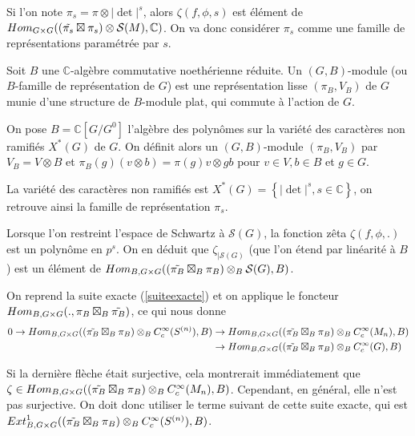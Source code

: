 Si l'on note $\pi_s = \pi \otimes |\det|^s$, alors $\zeta(f, \phi, s)$ est élément de $\operatorname{\mathnormal{Hom}}_{G \times G}((\tilde{\pi_s} \boxtimes \pi_s) \otimes \mathcal{S}(M), \mathbb{C})$. On va donc considérer $\pi_s$ comme une famille de représentations paramétrée par $s$.

\begin{definition}
Soit $B$ une $\mathbb{C}$-algèbre commutative noethérienne réduite. Un $(G, B)$-module (ou $B$-famille de représentation de $G$) est une représentation lisse $(\pi_B, V_B)$ de $G$ munie d'une structure de $B$-module plat, qui commute à l'action de $G$.
\end{definition}

On pose $B=\mathbb{C}[G/G^0]$ l'algèbre des polynômes sur la variété des caractères non ramifiés $X^*(G)$ de $G$. On définit alors un $(G,B)$-module $(\pi_B, V_B)$ par $V_B = V \otimes B$ et $\pi_B(g)(v \otimes b) = \pi(g)v \otimes gb$ pour $v \in V, b \in B$ et $g \in G$.

La variété des caractères non ramifiés est $X^*(G) = \left\lbrace |\det|^s, s \in \mathbb{C} \right\rbrace$, on retrouve ainsi la famille de représentation $\pi_s$.

Lorsque l'on restreint l'espace de Schwartz à $\mathcal{S}(G)$, la fonction zêta $\zeta(f, \phi, .)$ est un polynôme en $p^s$. On en déduit que $\zeta_{|\mathcal{S}(G)}$ (que l'on étend par linéarité à $B$) est un élément de $\operatorname{\mathnormal{Hom}}_{B, G \times G}((\tilde{\pi_B} \boxtimes_B \pi_B) \otimes_B \mathcal{S}(G), B)$.

On reprend la suite exacte (\ref{suiteexacte}) et on applique le foncteur $\operatorname{\mathnormal{Hom}}_{B, G \times G} (., \pi_B \boxtimes_B \tilde{\pi_B})$, ce qui nous donne
\begin{equation}
\begin{split}
0 \rightarrow \operatorname{\mathnormal{Hom}}_{B, G \times G}((\tilde{\pi_B} \boxtimes_B \pi_B) \otimes_B C^\infty_c(S^{(n)}), B) &\rightarrow \operatorname{\mathnormal{Hom}}_{B, G \times G}((\tilde{\pi_B} \boxtimes_B \pi_B) \otimes_B C^\infty_c(M_n), B) \\
&\rightarrow \operatorname{\mathnormal{Hom}}_{B, G \times G}((\tilde{\pi_B} \boxtimes_B \pi_B) \otimes_B C^\infty_c(G), B)
\end{split}
\end{equation}

Si la dernière flèche était surjective, cela montrerait immédiatement que $\zeta \in \operatorname{\mathnormal{Hom}}_{B, G \times G}((\tilde{\pi_B} \boxtimes_B \pi_B) \otimes_B C^\infty_c(M_n), B)$. Cependant, en général, elle n'est pas surjective. On doit donc utiliser le terme suivant de cette suite exacte, qui est $\operatorname{\mathnormal{Ext}}^1_{B, G \times G}((\tilde{\pi_B} \boxtimes_B \pi_B) \otimes_B C^\infty_c(S^{(n)}), B)$.

